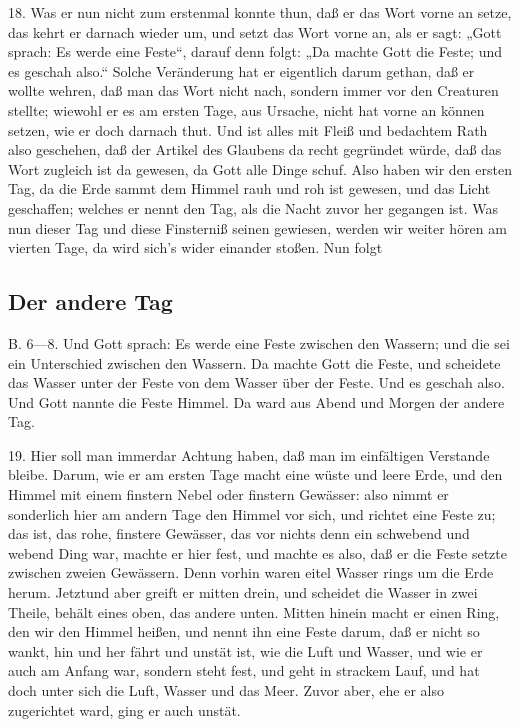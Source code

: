 18. Was er nun nicht zum erstenmal konnte thun, daß er das Wort vorne an setze, das kehrt er darnach wieder um, und setzt das Wort vorne an, als er sagt: „Gott sprach: Es werde eine Feste“, darauf denn folgt: „Da machte Gott die Feste; und es geschah also.“ Solche Veränderung hat er eigentlich darum gethan, daß er wollte wehren, daß man das Wort nicht nach, sondern immer vor den Creaturen stellte; wiewohl er es am ersten Tage, aus Ursache, nicht hat vorne an können setzen, wie er doch darnach thut. Und ist alles mit Fleiß und bedachtem Rath also geschehen, daß der Artikel des Glaubens da recht gegründet würde, daß das Wort zugleich ist da gewesen, da Gott alle Dinge schuf. Also haben wir den ersten Tag, da die Erde sammt dem Himmel rauh und roh ist gewesen,
und das Licht geschaffen; welches er nennt den Tag, als die Nacht zuvor her gegangen ist. Was nun dieser Tag und diese Finsterniß seinen gewiesen, werden wir weiter hören am vierten Tage, da wird sich’s wider einander stoßen. Nun folgt

\subsection{Der andere Tag}

B. 6—8. Und Gott sprach: Es werde eine Feste zwischen den Wassern; und die sei ein Unterschied zwischen den Wassern. Da machte Gott die Feste, und scheidete das Wasser unter der Feste von dem Wasser über der Feste. Und es geschah also. Und Gott nannte die Feste Himmel. Da ward aus Abend und Morgen der andere Tag.

19. Hier soll man immerdar Achtung haben, daß man im einfältigen Verstande bleibe. Darum, wie er am ersten Tage macht eine wüste und leere Erde, und den Himmel mit einem finstern Nebel oder finstern Gewässer: also nimmt er sonderlich hier am andern Tage den Himmel vor sich, und richtet eine Feste zu; das ist, das rohe, finstere Gewässer, das vor nichts denn ein schwebend und webend Ding war, machte er hier fest, und machte es also, daß er die Feste setzte zwischen zweien Gewässern. Denn vorhin waren eitel Wasser rings um die Erde herum. Jetztund aber greift er mitten drein, und scheidet die Wasser in zwei Theile, behält eines oben, das andere unten. Mitten hinein macht er einen Ring, den wir den Himmel heißen, und nennt ihn eine Feste darum, daß er nicht so wankt, hin und her fährt und unstät ist, wie die Luft und Wasser, und wie er auch am Anfang war, sondern steht fest, und geht in strackem Lauf, und hat doch unter sich die Luft, Wasser und das Meer. Zuvor aber, ehe er also zugerichtet ward, ging er auch unstät.

